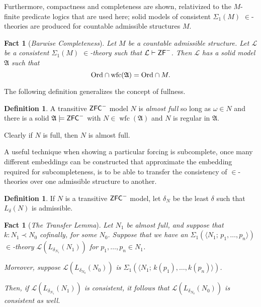 \documentclass{amsart}
\newtheorem{fact}[theorem]{Fact}
\theoremstyle{definition}
\newtheorem{definition}[theorem]{Definition}
\theoremstyle{remark}
\newcommand{\N}{{\overline{N}}}
\newcommand{\ZFC}{\textup{\ensuremath{\textsf{ZFC}}}}
\newcommand{\Ord}{\textup{\ensuremath{\text{Ord}}}}
\DeclareMathOperator{\wfc}{wfc}
\begin{document}
Furthermore, compactness and completeness are shown, relativized to the $M$-finite predicate logics that are used here; solid models of consistent $\Sigma_1(M)$ $\in$-theories are produced for countable admissible structures $M$. 

\begin{fact}[\emph{Barwise Completeness}] \label{fact:completeness} Let $M$ be a countable admissible structure. Let $\mathcal L$ be a consistent $\Sigma_1(M)$ $\in$-theory such that $\mathcal L \vdash \textsf{\textup{ZF}}^-$. Then $\mathcal L$ has a solid model $\mathfrak A$ such that $$\Ord \cap \wfc(\mathfrak A) = \Ord \cap M.$$ \end{fact}

The following definition generalizes the concept of fullness.
\begin{definition} A transitive $\ZFC^-$ model $N$ is \emph{almost full} so long as $\omega \in N$ and there is a solid $\mathfrak A \models \ZFC^-$ with $N \in \wfc(\mathfrak A)$ and $N$ is regular in $\mathfrak A$. \end{definition}
Clearly if $N$ is full, then $N$ is almost full.

A useful technique when showing a particular forcing is subcomplete, once many different embeddings can be constructed that approximate the embedding required for subcompleteness, is to be able to transfer the consistency of $\in$-theories over one admissible structure to another. 
\begin{definition} If $N$ is a transitive $\ZFC^-$ model, let $\delta_N$ be the least $\delta$ such that $L_\delta(N)$ is admissible. \end{definition}

%

\begin{fact}[\emph{The Transfer Lemma}]\label{fact:Transfer} Let $N_1$ be almost full, and suppose that $k: N_1 \prec N_0$ cofinally, for some $N_0$. Suppose that we have an $\Sigma_1(\langle N_1; \, p_1, \dots, p_n\rangle)$  $\in$-theory $\mathcal L(L_{\delta_{N_1}}(N_1))$ for $p_1, \dots, p_n \in N_1$.

Moreover, suppose $\mathcal L(L_{\delta_{N_0}}(N_0))$ is $\Sigma_1(\langle N_1; \, k(p_1), \dots, k(p_n)\rangle)$. 

Then, 
if $\mathcal L(L_{\delta_{N_1}}(N_1))$ is consistent, it follows that $\mathcal L(L_{\delta_{N_0}}(N_0))$ is consistent as well. \end{fact} 
\end{document}
